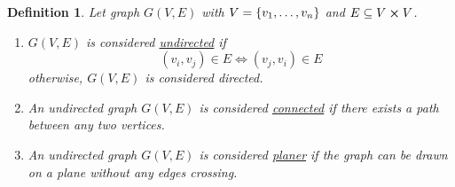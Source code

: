 \documentclass[]{article}
\numberwithin{equation}{section}
\newtheorem{definition}{Definition}
\begin{document}
\begin{definition} \label{def:graph_properties}
	Let graph $G(V,E)$ with $V = \qty{v_1,\dots,v_n}$ and $E \subseteq V \cross V$.
	\begin{enumerate}
		\item $G(V,E)$ is considered \underline{\emph{undirected}} if\[
			(v_i,v_j) \in E \iff (v_j,v_i) \in E
		\] otherwise, $G(V,E)$ is considered \emph{directed}.
		\item An undirected graph $G(V,E)$ is considered \underline{\emph{connected}} if there exists a path between any two vertices.
		\item An undirected graph $G(V,E)$ is considered \underline{\emph{planer}} if the graph can be drawn on a plane without any edges crossing.
	\end{enumerate}
\end{definition}
\end{document}
